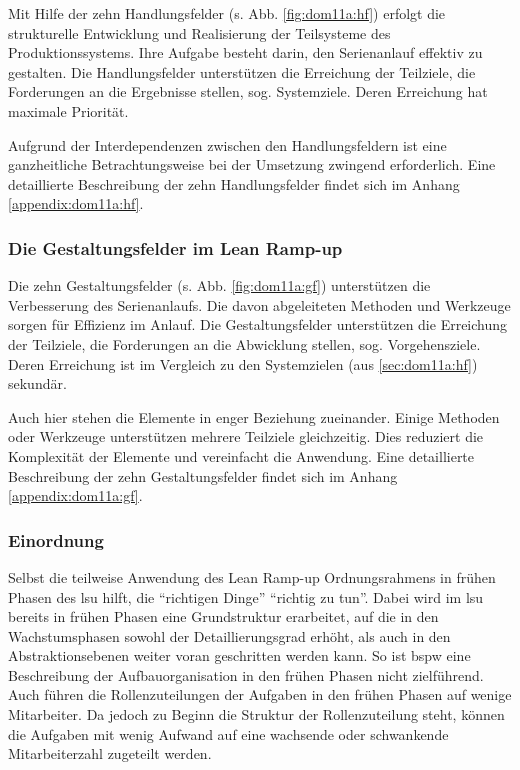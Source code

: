 Mit Hilfe der zehn Handlungsfelder (s. Abb. \ref{fig:dom11a:hf}) erfolgt die strukturelle Entwicklung und Realisierung der Teilsysteme des Produktionssystems. Ihre Aufgabe besteht darin, den Serienanlauf effektiv zu gestalten. Die Handlungsfelder unterstützen die Erreichung der Teilziele, die Forderungen an die Ergebnisse stellen, sog. Systemziele. Deren Erreichung hat maximale Priorität. 

Aufgrund der Interdependenzen zwischen den Handlungsfeldern ist eine ganzheitliche Betrachtungsweise bei der Umsetzung zwingend erforderlich. 
Eine detaillierte Beschreibung der zehn Handlungsfelder findet sich im Anhang \ref{appendix:dom11a:hf}. %

  
\subsubsection{Die Gestaltungsfelder im Lean Ramp-up}\label{sec:dom11a:gf}
Die zehn Gestaltungsfelder (s. Abb. \ref{fig:dom11a:gf}) unterstützen die Verbesserung des Serienanlaufs. Die davon abgeleiteten Methoden und Werkzeuge sorgen für Effizienz im Anlauf. Die Gestaltungsfelder unterstützen die Erreichung der Teilziele, die Forderungen an die Abwicklung stellen, sog. Vorgehensziele. Deren Erreichung ist im Vergleich zu den Systemzielen (aus \ref{sec:dom11a:hf}) sekundär. 

Auch hier stehen die Elemente in enger Beziehung zueinander. Einige Methoden oder Werkzeuge unterstützen mehrere Teilziele gleichzeitig. Dies reduziert die Komplexität der Elemente und vereinfacht die Anwendung. 
Eine detaillierte Beschreibung der zehn Gestaltungsfelder findet sich im Anhang \ref{appendix:dom11a:gf}. %

\subsubsection{Einordnung}
Selbst die teilweise Anwendung des Lean Ramp-up Ordnungsrahmens in frühen Phasen des \gls{lsu} hilft, die ``richtigen Dinge'' ``richtig zu tun''. Dabei wird im \gls{lsu} bereits in frühen Phasen eine Grundstruktur erarbeitet, auf die in den Wachstumsphasen sowohl der Detaillierungsgrad erhöht, als auch in den Abstraktionsebenen weiter voran geschritten werden kann. So ist \gls{bspw} eine Beschreibung der Aufbauorganisation in den frühen Phasen nicht zielführend. Auch führen die Rollenzuteilungen der Aufgaben in den frühen Phasen auf wenige Mitarbeiter. Da jedoch zu Beginn die Struktur der Rollenzuteilung steht, können die Aufgaben mit wenig Aufwand auf eine wachsende oder schwankende Mitarbeiterzahl zugeteilt werden. 

